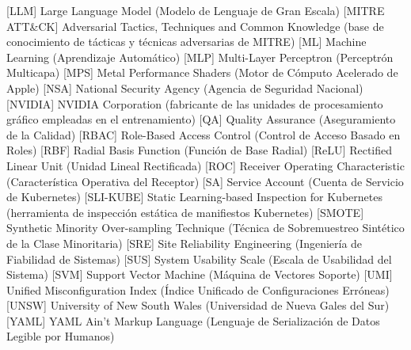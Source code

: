 \begin{acronym}[SMOTE]
    [LLM]   {Large Language Model (Modelo de Lenguaje de Gran Escala)}
   [MITRE ATT\&CK] {Adversarial Tactics, Techniques and Common Knowledge (base de conocimiento de tácticas y técnicas adversarias de MITRE)}
     [ML]    {Machine Learning (Aprendizaje Automático)}
    [MLP]   {Multi-Layer Perceptron (Perceptrón Multicapa)}
    [MPS]   {Metal Performance Shaders (Motor de Cómputo Acelerado de Apple)}
    [NSA]   {National Security Agency (Agencia de Seguridad Nacional)}
   [NVIDIA] {NVIDIA Corporation (fabricante de las unidades de procesamiento gráfico empleadas en el entrenamiento)}
     [QA]    {Quality Assurance (Aseguramiento de la Calidad)}
   [RBAC]  {Role-Based Access Control (Control de Acceso Basado en Roles)}
    [RBF]   {Radial Basis Function (Función de Base Radial)}
   [ReLU]  {Rectified Linear Unit (Unidad Lineal Rectificada)}
    [ROC]   {Receiver Operating Characteristic (Característica Operativa del Receptor)}
     [SA]    {Service Account (Cuenta de Servicio de Kubernetes)}
   [SLI-KUBE] {Static Learning-based Inspection for Kubernetes (herramienta de inspección estática de manifiestos Kubernetes)}
  [SMOTE] {Synthetic Minority Over-sampling Technique (Técnica de Sobremuestreo Sintético de la Clase Minoritaria)}
    [SRE]   {Site Reliability Engineering (Ingeniería de Fiabilidad de Sistemas)}
    [SUS]   {System Usability Scale (Escala de Usabilidad del Sistema)}
    [SVM]   {Support Vector Machine (Máquina de Vectores Soporte)}
    [UMI]   {Unified Misconfiguration Index (Índice Unificado de Configuraciones Erróneas)}
   [UNSW]  {University of New South Wales (Universidad de Nueva Gales del Sur)}
   [YAML]  {YAML Ain't Markup Language (Lenguaje de Serialización de Datos Legible por Humanos)}
\end{acronym}
